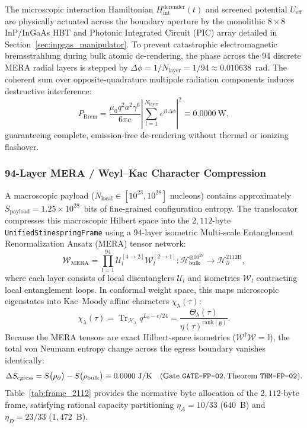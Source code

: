\documentclass[11pt,onecolumn]{article}
\DeclareMathOperator{\Tr}{Tr}
\begin{document}
The microscopic interaction Hamiltonian $H_{\text{int}}^{\text{derender}}(t)$ and screened potential $U_{\text{eff}}$ are physically actuated across the boundary aperture by the monolithic $8\times 8$ InP/InGaAs HBT and Photonic Integrated Circuit (PIC) array detailed in Section~\ref{sec:inpgas_manipulator}. To prevent catastrophic electromagnetic bremsstrahlung during bulk atomic de-rendering, the phase across the 94 discrete MERA radial layers is stepped by $\Delta\phi = 1/N_{\text{layer}} = 1/94 \approx 0.010638$~rad. The coherent sum over opposite-quadrature multipole radiation components induces destructive interference:
\begin{equation}
P_{\text{Brem}} = \frac{\mu_0 q^2 a^2 \gamma^6}{6\pi c} \left|\sum_{l=1}^{N_{\text{layer}}} e^{i l \Delta\phi}\right|^2 \equiv 0.0000~\text{W},
\label{eq:brem_zero}
\end{equation}
guaranteeing complete, emission-free de-rendering without thermal or ionizing flashover.

\subsubsection{94-Layer MERA / Weyl--Kac Character Compression}
A macroscopic payload ($N_{\text{local}} \in [10^{23}, 10^{28}]$ nucleons) contains approximately $S_{\text{payload}} = 1.25\times 10^{28}$~bits of fine-grained configuration entropy. The translocator compresses this macroscopic Hilbert space into the $2{,}112$-byte \texttt{UnifiedStinespringFrame} using a 94-layer isometric Multi-scale Entanglement Renormalization Ansatz (MERA) tensor network:
\begin{equation}
\mathcal{W}_{\text{MERA}} = \prod_{l=1}^{94} \mathcal{U}_l^{[4\to 2]} \mathcal{W}_l^{[2\to 1]} : \mathcal{H}_{\text{bulk}}^{\otimes 10^{28}} \longrightarrow \mathcal{H}_{\partial}^{2112\text{B}},
\label{eq:fp_mera}
\end{equation}
where each layer consists of local disentanglers $\mathcal{U}_l$ and isometries $\mathcal{W}_l$ contracting local entanglement loops. In conformal weight space, this maps microscopic eigenstates into Kac--Moody affine characters $\chi_\lambda(\tau)$:
\begin{equation}
\chi_\lambda(\tau) = \Tr_{\mathcal{H}_\lambda} q^{L_0 - c/24} = \frac{\Theta_\lambda(\tau)}{\eta(\tau)^{\mathrm{rank}(\mathfrak{g})}}.
\end{equation}
Because the MERA tensors are exact Hilbert-space isometries ($\mathcal{W}^\dagger \mathcal{W} = \mathbb{I}$), the total von Neumann entropy change across the egress boundary vanishes identically:
\begin{equation}
\Delta S_{\text{egress}} = S\bigl(\rho_{\partial}\bigr) - S\bigl(\rho_{\text{bulk}}\bigr) \equiv 0.0000~\text{J/K} \quad (\text{Gate \texttt{GATE-FP-02}}, \text{Theorem \texttt{THM-FP-02}}).
\end{equation}
Table~\ref{tab:frame_2112} provides the normative byte allocation of the $2{,}112$-byte frame, satisfying rational capacity partitioning $\eta_A = 10/33$ ($640$~B) and $\eta_D = 23/33$ ($1{,}472$~B).
\end{document}
